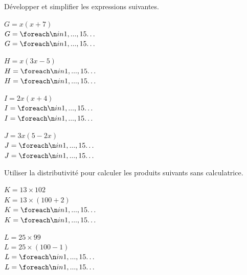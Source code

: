 \documentclass[a4paper]{book}
\begin{document}
    \vspace{0.5cm}
    
    \begin{exercice}
        Développer et simplifier les expressions suivantes.
        \vspace{0.3cm}
        
        \begin{minipage}[t]{0.48\textwidth}
        $G = x(x + 7)$ \\
        $G = \points[15]$ \\
        $G = \points[15]$
        \end{minipage}
        \hfill
        \begin{minipage}[t]{0.48\textwidth}
        $H = x(3x - 5)$ \\
        $H = \points[15]$ \\
        $H = \points[15]$
        \end{minipage}
        
        \vspace{0.8cm}
        
        \begin{minipage}[t]{0.48\textwidth}
        $I = 2x(x + 4)$ \\
        $I = \points[15]$ \\
        $I = \points[15]$
        \end{minipage}
        \hfill
        \begin{minipage}[t]{0.48\textwidth}
        $J = 3x(5 - 2x)$ \\
        $J = \points[15]$ \\
        $J = \points[15]$
        \end{minipage}
    \end{exercice}
    
    \vspace{0.5cm}
    
    \begin{exercice}
        Utiliser la distributivité pour calculer les produits suivants sans calculatrice.
        \vspace{0.3cm}
        
        \begin{minipage}[t]{0.48\textwidth}
        $K = 13 \times 102$ \\
        $K = 13 \times (100 + 2)$ \\
        $K = \points[15]$ \\
        $K = \points[15]$
        \end{minipage}
        \hfill
        \begin{minipage}[t]{0.48\textwidth}
        $L = 25 \times 99$ \\
        $L = 25 \times (100 - 1)$ \\
        $L = \points[15]$ \\
        $L = \points[15]$
        \end{minipage}
    \end{exercice}
        
\end{document}
